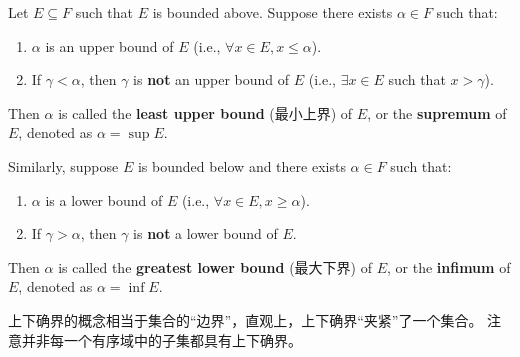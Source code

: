 \documentclass[
	UTF-8,
	11pt, %
	a4paper, %
]{LegrandOrangeBook}
\begin{document}
    \begin{definition}
    Let $E \subseteq F$ such that $E$ is bounded above. Suppose there exists $\alpha \in F$ such that:
    \begin{enumerate}
        \item $\alpha$ is an upper bound of $E$ (i.e., $\forall x \in E, x \le \alpha$).
        \item If $\gamma < \alpha$, then $\gamma$ is \textbf{not} an upper bound of $E$ (i.e., $\exists x \in E$ such that $x > \gamma$).
    \end{enumerate}
    Then $\alpha$ is called the \textbf{least upper bound} (最小上界) of $E$, or the \textbf{supremum} of $E$, denoted as $\alpha = \sup E$.
    \end{definition}

    \begin{definition}
    Similarly, suppose $E$ is bounded below and there exists $\alpha \in F$ such that:
    \begin{enumerate}
        \item $\alpha$ is a lower bound of $E$ (i.e., $\forall x \in E, x \ge \alpha$).
        \item If $\gamma > \alpha$, then $\gamma$ is \textbf{not} a lower bound of $E$.
    \end{enumerate}
    Then $\alpha$ is called the \textbf{greatest lower bound} (最大下界) of $E$, or the \textbf{infimum} of $E$, denoted as $\alpha = \inf E$.
    \end{definition}

    \begin{remark}
        上下确界的概念相当于集合的“边界”，直观上，上下确界“夹紧”了一个集合。
        注意并非每一个有序域中的子集都具有上下确界。
    \end{remark}
\end{document}

